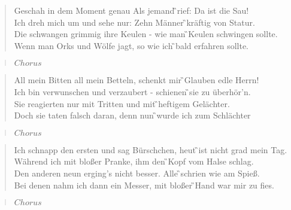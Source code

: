 \documentclass[9pt,a4paper,oneside, onecolumn]{article}
\begin{document}
\begin{verse}
Geschah in \Am{}dem Moment \Dm{}genau Als jemand \G{}rief: Da ist die \Em{}Sau!\\
Ich dreh mich \Am{}um und sehe \Dm{}nur: Zehn Männer \G{}kräftig von \Em{}Statur.\\
Die schwangen \F{}grimmig ihre \C{}Keulen - wie man \G{}Keulen schwingen \Am{}sollte.\\
Wenn man \F{}Orks und Wölfe \C{}jagt, so wie ich \G{}bald erfahren \Am{}sollte.\\
\end{verse}

\begin{verse}
$Chorus$\\
\end{verse}

\begin{verse}
All mein \Am{}Bitten all mein \Dm{}Betteln, schenkt mir \G{}Glauben edle \Em{}Herrn!\\
Ich bin ver\Am{}wunschen und ver\Dm{}zaubert - schienen \G{}sie zu über\Em{}hör'n.\\
Sie rea\F{}gierten nur mit \C{}Tritten und mit \G{}heftigem Ge\Am{}lächter.\\
Doch sie \F{}taten falsch da\C{}ran, denn nun \G{}wurde ich zum \Am{}Schlächter\\
\end{verse}

\begin{verse}
$Chorus$\\
\end{verse}

\begin{verse}
Ich schnapp den \Am{}ersten und sag \Dm{}Bürschchen, heut \G{}ist nicht grad mein \Em{}Tag.\\
Während \Am{}ich mit bloßer \Dm{}Pranke, ihm den \G{}Kopf vom Halse \Em{}schlag.\\
Den anderen \F{}neun erging's nicht \C{}besser. Alle \G{}schrien wie am \Am{}Spieß.\\
Bei denen \F{}nahm ich dann ein \C{}Messer, mit bloßer \G{}Hand war mir zu \Am{}fies.\\
\end{verse}

\begin{verse}
$Chorus$\\
\end{verse}
\end{document}
